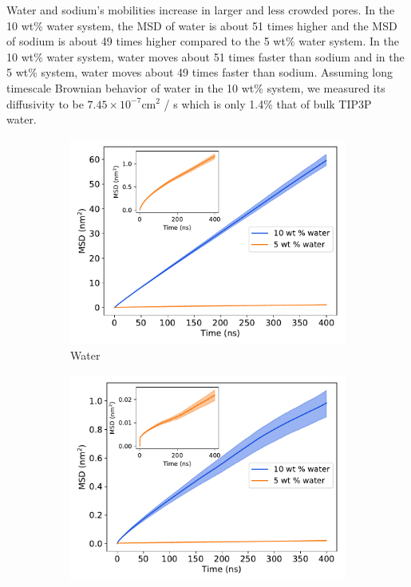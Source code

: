 \documentclass[journal=jpcbfk,manuscript=article]{achemso}
\begin{document}
  Water and sodium's mobilities increase in larger and less crowded pores. 
  In the 10 wt\% water system, the MSD of water is about 51 times higher and
  the MSD of sodium is about 49 times higher compared to the 5 wt\% water system. 
  In the 10 wt\% water system, water moves about 51 times faster than sodium 
  and in the 5 wt\% system, water moves about 49 times faster than sodium. Assuming
  long timescale Brownian behavior of water in the 10 wt\% system, we measured its
  diffusivity to be $7.45 \times 10^{-7}$cm$^2$ / s which is only 1.4\% that of bulk TIP3P 
  water.~\cite{mahoney_diffusion_2000} %
  
  \begin{figure}[!htb]
  \centering
  \begin{subfigure}{0.45\textwidth}
  \includegraphics[width=\textwidth]{water_msd_comparison.pdf}
  \caption{Water}\label{fig:water_msd_comparison}
  \end{subfigure}
  \begin{subfigure}{0.45\textwidth}
  \includegraphics[width=\textwidth]{na_msd_comparison.pdf}

\end{subfigure}
\end{figure}
\end{document}
